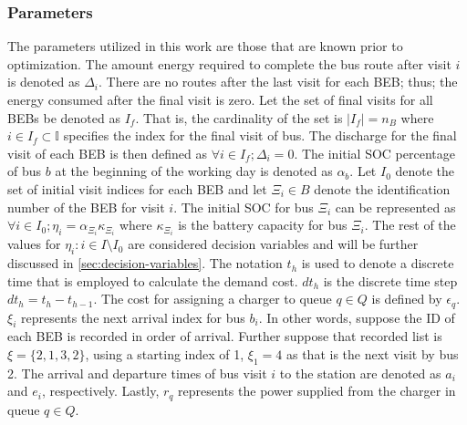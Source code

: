 \documentclass[11pt,a4paper,final]{article}
\newcommand{\I}{\mathbb{I}}                 %
\newcommand{\Isetinit}{I_0}                 %
\newcommand{\Isetfinal}{I_f}                %
\begin{document}
\subsubsection{Parameters}
\label{sec:input-variables}
The parameters utilized in this work are those that are known prior to optimization. The amount energy required to
complete the bus route after visit \(i\) is denoted as \(\Delta_i\). There are no routes after the last visit for each BEB; thus;
the energy consumed after the final visit is zero. Let the set of final visits for all BEBs be denoted as \(\Isetfinal\).
That is, the cardinality of the set is \(\lvert \Isetfinal \rvert = n_B\) where \(i \in \Isetfinal \subset \I\) specifies the index
for the final visit of bus. The discharge for the final visit of each BEB is then defined as \(\forall i \in \Isetfinal; \Delta_{i} =
0\). The initial SOC percentage of bus \(b\) at the beginning of the working day is denoted as \(\alpha_b\). Let \(\Isetinit\)
denote the set of initial visit indices for each BEB and let \(\Xi_i \in B\) denote the identification number of the BEB for
visit \(i\). The initial SOC for bus \(\Xi_i\) can be represented as \(\forall i \in \Isetinit; \eta_{i} = \alpha_{\Xi_i}\kappa_{\Xi_i}\) where \(\kappa_{\Xi_i}\)
is the battery capacity for bus \(\Xi_i\). The rest of the values for \(\eta_i : i \in I \setminus \Isetinit\) are considered decision
variables and will be further discussed in \ref{sec:decision-variables}. The notation \(t_h\) is used to denote a discrete time
that is employed to calculate the demand cost. \(dt_h\) is the discrete time step \(dt_h = t_h - t_{h-1}\). The cost for
assigning a charger to queue \(q \in Q\) is defined by \(\epsilon_q\). \(\xi_i\) represents the next arrival index for bus \(b_i\). In
other words, suppose the ID of each BEB is recorded in order of arrival. Further suppose that recorded list is \(\xi = \{
2,1,3,2 \}\), using a starting index of 1, \(\xi_1 = 4\) as that is the next visit by bus 2. The arrival and departure times
of bus visit \(i\) to the station are denoted as \(a_i\) and \(e_i\), respectively. Lastly, \(r_q\) represents the power
supplied from the charger in queue \(q \in Q\).
\end{document}
